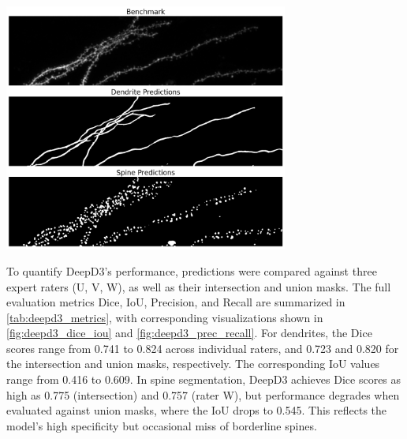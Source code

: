 \begin{center}
\includegraphics[width=0.7\textwidth]{figures/20_deepd3_max.png}
\label{fig:deepd3_max_proj}
\end{center}

To quantify \gls{DeepD3}’s performance, predictions were compared against three expert raters (U, V, W), as well as their intersection and union masks. The full evaluation metrics Dice, \gls{IoU}, Precision, and Recall are summarized in \autoref{tab:deepd3_metrics}, with corresponding visualizations shown in \autoref{fig:deepd3_dice_iou} and \autoref{fig:deepd3_prec_recall}. For dendrites, the Dice scores range from 0.741 to 0.824 across individual raters, and 0.723 and 0.820 for the intersection and union masks, respectively. The corresponding \gls{IoU} values range from 0.416 to 0.609. In spine segmentation, \gls{DeepD3} achieves Dice scores as high as 0.775 (intersection) and 0.757 (rater W), but performance degrades when evaluated against union masks, where the \gls{IoU} drops to 0.545. This reflects the model's high specificity but occasional miss of borderline spines. 


